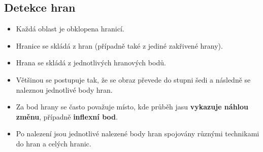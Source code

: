 \subsection{Detekce hran}
\begin{itemize}
	\item Každá oblast je obklopena hranicí.
	\item Hranice se skládá z hran (případně také z jediné zakřivené hrany).

	\item Hrana se skládá z jednotlivých hranových bodů.
	\item Většinou se postupuje tak, že se obraz převede do stupni šedi a následně se naleznou jednotlivé body hran.
	\item Za bod hrany se často považuje místo, kde průběh jasu \textbf{vykazuje náhlou změnu}, případně \textbf{inflexní bod}.
	\item Po nalezení jsou jednotlivé nalezené body hran spojovány různými technikami do hran a celých hranic.
\end{itemize}
